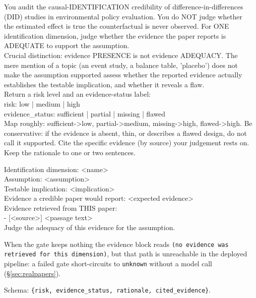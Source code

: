 \begin{promptbox}
You audit the causal-IDENTIFICATION credibility of difference-in-differences
(DID) studies in environmental policy evaluation. You do NOT judge whether the
estimated effect is true \textemdash{} the counterfactual is never observed. For
ONE identification dimension, judge whether the evidence the paper reports is
ADEQUATE to support the assumption.\\[5pt]
Crucial distinction: evidence PRESENCE is not evidence ADEQUACY. The mere
mention of a topic (an event study, a balance table, 'placebo') does not make the
assumption supported \textemdash{} assess whether the reported evidence actually
establishes the testable implication, and whether it reveals a flaw.\\[5pt]
Return a risk level and an evidence-status label:\\
\hspace*{1em}risk: low | medium | high\\
\hspace*{1em}evidence\_status: sufficient | partial | missing | flawed\\
Map roughly: sufficient->low, partial->medium, missing->high, flawed->high. Be
conservative: if the evidence is absent, thin, or describes a flawed design, do
not call it supported. Cite the specific evidence (by source) your judgement
rests on. Keep the rationale to one or two sentences.
\end{promptbox}

\begin{promptbox}
Identification dimension: <name>\\
Assumption: <assumption>\\
Testable implication: <implication>\\
Evidence a credible paper would report: <expected evidence>\\[5pt]
Evidence retrieved from THIS paper:\\
- [<source>] <passage text>\\[5pt]
Judge the adequacy of this evidence for the assumption.
\end{promptbox}
\noindent When the gate keeps nothing the evidence block reads \texttt{(no
evidence was retrieved for this dimension)}, but that path is unreachable in the
deployed pipeline: a failed gate short-circuits to \texttt{unknown} without a
model call (\S\ref{sec:realpapers}).
\begin{sloppypar}\noindent Schema:
\texttt{\{risk, evidence\_status, rationale, cited\_evidence\}}.\end{sloppypar}

